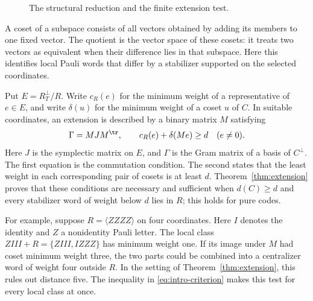 \begin{figure}[htbp]
\centering
{}
\caption{The structural reduction and the finite extension test.}
\label{fig:proof-flow}
\end{figure}

A coset of a subspace consists of all vectors obtained by adding its
members to one fixed vector. The quotient is the vector space of these
cosets: it treats two vectors as equivalent when their difference lies
in that subspace. Here this identifies local Pauli words that differ by
a stabilizer supported on the selected coordinates.

Put \(E=R_T^\perp/R\). Write \(c_R(e)\) for the minimum weight of a
representative of \(e\in E\), and write \(\delta(u)\) for the minimum
weight of a coset \(u\) of \(C\). In suitable coordinates, an extension
is described by a binary matrix \(M\) satisfying
\begin{equation}\label{eq:intro-criterion}
 \Gamma=MJM^\tr,\qquad c_R(e)+\delta(Me)\geq d\quad(e\ne0).
\end{equation}
Here \(J\) is the symplectic matrix on \(E\), and \(\Gamma\) is the
Gram matrix of a basis of \(C^\perp\). The first equation is the
commutation condition. The second states that the least weight in each
corresponding pair of cosets is at least \(d\).
Theorem~\ref{thm:extension} proves that these conditions are necessary
and sufficient when \(d(C)\geq d\) and every stabilizer word of weight
below \(d\) lies in \(R\); this holds for pure codes.

For example, suppose \(R=\langle ZZZZ\rangle\) on four coordinates.
Here \(I\) denotes the identity and \(Z\) a nonidentity Pauli letter.
The local class \(ZIII+R=\{ZIII,IZZZ\}\) has minimum weight one.
If its image under \(M\) had coset minimum weight three, the two
parts could be combined into a centralizer word of weight four outside
\(R\). In the setting of Theorem~\ref{thm:extension}, this rules out
distance five. The inequality in \eqref{eq:intro-criterion} makes this
test for every local class at once.

